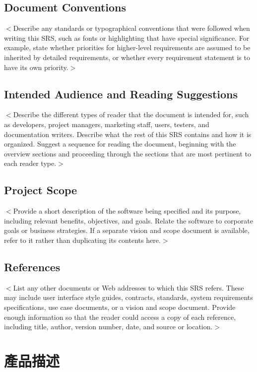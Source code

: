 \documentclass{scrreprt}
\begin{document}
\begin{CJK}{UTF8}{bkai}
\section{Document Conventions}
$<$Describe any standards or typographical conventions that were followed when 
writing this SRS, such as fonts or highlighting that have special significance.  
For example, state whether priorities  for higher-level requirements are assumed 
to be inherited by detailed requirements, or whether every requirement statement 
is to have its own priority.$>$

\section{Intended Audience and Reading Suggestions}
$<$Describe the different types of reader that the document is intended for, 
such as developers, project managers, marketing staff, users, testers, and 
documentation writers. Describe what the rest of this SRS contains and how it is 
organized. Suggest a sequence for reading the document, beginning with the 
overview sections and proceeding through the sections that are most pertinent to 
each reader type.$>$

\section{Project Scope}
$<$Provide a short description of the software being specified and its purpose, 
including relevant benefits, objectives, and goals. Relate the software to 
corporate goals or business strategies. If a separate vision and scope document 
is available, refer to it rather than duplicating its contents here.$>$

\section{References}
$<$List any other documents or Web addresses to which this SRS refers. These may 
include user interface style guides, contracts, standards, system requirements 
specifications, use case documents, or a vision and scope document. Provide 
enough information so that the reader could access a copy of each reference, 
including title, author, version number, date, and source or location.$>$


\chapter{產品描述}


\end{CJK}
\end{document}

